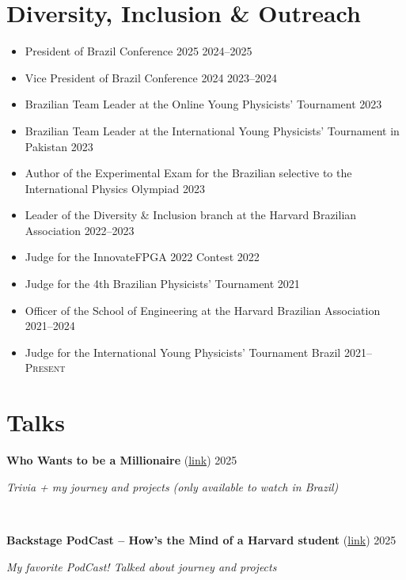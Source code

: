 \documentclass[letterpaper,10pt]{article}
\newcommand{\entry}[4]{

\begin{minipage}[t]{.15\textwidth}
\end{minipage}
\hfill\vline\hfill 
\begin{minipage}[t]{0.95\textwidth}
#2 \hfill \textsc{#1}

\textit{#3}

\footnotesize{#4}
\end{minipage}\\\vspace{.25cm}}
\newcommand{\mycomment}[1]{}
\begin{document}
\section{Diversity, Inclusion \& Outreach}
\begin{itemize}
	\item President of Brazil Conference 2025
    \hfill\textsc{2024--2025}

    \item Vice President of Brazil Conference 2024
    \hfill\textsc{2023--2024}

    \item Brazilian Team Leader at the Online Young Physicists' Tournament
    \hfill\textsc{2023}

	\item Brazilian Team Leader at the International Young Physicists' Tournament in Pakistan
    \hfill\textsc{2023}

    \item Author of the Experimental Exam for the Brazilian selective to the International Physics Olympiad
    \hfill\textsc{2023}

    \item Leader of the Diversity \& Inclusion branch at the Harvard Brazilian Association
	\hfill\textsc{2022--2023}

	\item Judge for the InnovateFPGA 2022 Contest
    \hfill\textsc{2022}

    \item Judge for the 4th Brazilian Physicists' Tournament
    \hfill\textsc{2021}

    \item Officer of the School of Engineering at the Harvard Brazilian Association
	\hfill\textsc{2021--2024}

    \item Judge for the International Young Physicists' Tournament Brazil
	\hfill\textsc{2021--Present}
	\end{itemize}
\vspace*{-.25cm}
\section{Talks}
\entry{2025}{\textbf{Who Wants to be a Millionaire} (\href{https://globoplay.globo.com/v/13718386/}{link})}{Trivia + my journey and projects (only available to watch in Brazil)}{}

\entry{2025}{\textbf{Backstage PodCast -- How's the Mind of a Harvard student} (\href{https://www.youtube.com/watch?v=lUqDgKRqxhY}{link})}{My favorite PodCast! Talked about journey and projects}{}
\end{document}
